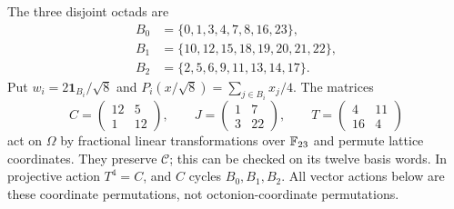 \documentclass[10pt,reqno]{amsart}
\theoremstyle{remark}\newtheorem{remark}[theorem]{Remark}
\newcommand{\one}{\mathbf1}\newcommand{\Span}{\operatorname{span}}
\begin{document}
The three disjoint octads are
\begin{align*}
B_0&=\{0,1,3,4,7,8,16,23\},\\
B_1&=\{10,12,15,18,19,20,21,22\},\\
B_2&=\{2,5,6,9,11,13,14,17\}.
\end{align*}
Put $w_i=2\one_{B_i}/\sqrt8$ and $P_i(x/\sqrt8)=\sum_{j\in B_i}x_j/4$. The matrices
\[
C=\begin{pmatrix}12&5\\1&12\end{pmatrix},\qquad
J=\begin{pmatrix}1&7\\3&22\end{pmatrix},\qquad
T=\begin{pmatrix}4&11\\16&4\end{pmatrix}
\]
act on $\Omega$ by fractional linear transformations over $\mathbb F_{23}$ and permute lattice coordinates. They preserve $\mathcal C$; this can be checked on its twelve basis words. In projective action $T^4=C$, and $C$ cycles $B_0,B_1,B_2$. All vector actions below are these coordinate permutations, not octonion-coordinate permutations.
\end{document}
